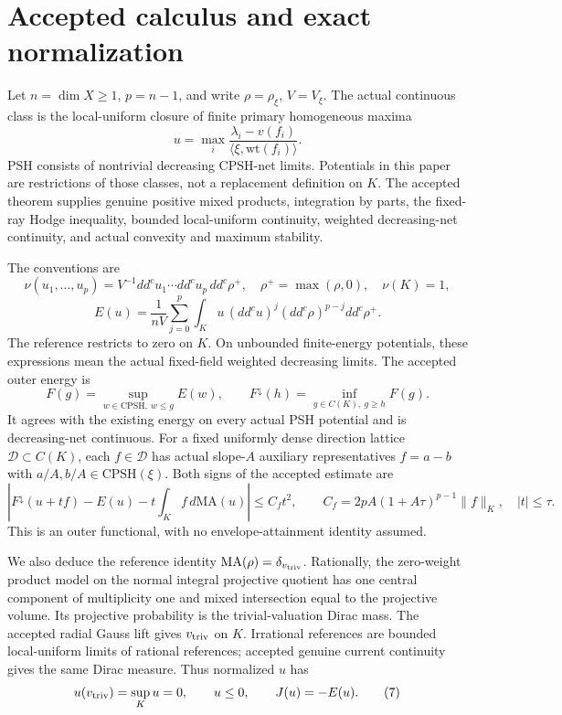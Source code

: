 \documentclass[
  10pt,
]{article}
\begin{document}
\section{Accepted calculus and exact
normalization}\label{accepted-calculus-and-exact-normalization}

Let \(n=\dim X\ge1\), \(p=n-1\), and write \(\rho=\rho_\xi\),
\(V=V_\xi\). The actual continuous class is the local-uniform closure of
finite primary homogeneous maxima
\[u=\max_i\frac{\lambda_i-v(f_i)}{\langle\xi,\mathrm{wt}(f_i)\rangle}.\]
PSH consists of nontrivial decreasing CPSH-net limits. Potentials in
this paper are restrictions of those classes, not a replacement
definition on \(K\). The accepted theorem supplies genuine positive
mixed products, integration by parts, the fixed-ray Hodge inequality,
bounded local-uniform continuity, weighted decreasing-net continuity,
and actual convexity and maximum stability.

The conventions are \[
 \nu(u_1,\ldots,u_p)=V^{-1}dd^cu_1\cdots dd^cu_p\,dd^c\rho^+,
 \quad \rho^+=\max(\rho,0),\quad \nu(K)=1,
 \tag{3}
\] \[
 E(u)=\frac1{nV}\sum_{j=0}^p\int_Ku\,(dd^cu)^j(dd^c\rho)^{p-j}dd^c\rho^+.
 \tag{4}
\] The reference restricts to zero on \(K\). On unbounded finite-energy
potentials, these expressions mean the actual fixed-field weighted
decreasing limits. The accepted outer energy is
\[F(g)=\sup_{w\in\mathrm{CPSH},\ w\le g}E(w),\qquad
 F^\downarrow(h)=\inf_{g\in C(K),\ g\ge h}F(g). \tag{5}\] It agrees with
the existing energy on every actual PSH potential and is decreasing-net
continuous. For a fixed uniformly dense direction lattice
\(\mathscr D\subset C(K)\), each \(f\in\mathscr D\) has actual
slope-\(A\) auxiliary representatives \(f=a-b\) with
\(a/A,b/A\in\mathrm{CPSH}(\xi)\). Both signs of the accepted estimate
are \[
 |F^\downarrow(u+tf)-E(u)-t\int_Kf\,d\mathrm{MA}(u)|
 \le C_f t^2,\qquad C_f=2pA(1+A\tau)^{p-1}\|f\|_K,\quad |t|\le\tau.
 \tag{6}
\] This is an outer functional, with no envelope-attainment identity
assumed.

We also deduce the reference identity
\(\mathrm{MA}(\rho)=\delta_{v_{\rm triv}}\). Rationally, the zero-weight
product model on the normal integral projective quotient has one central
component of multiplicity one and mixed intersection equal to the
projective volume. Its projective probability is the trivial-valuation
Dirac mass. The accepted radial Gauss lift gives \(v_{\rm triv}\) on
\(K\). Irrational references are bounded local-uniform limits of
rational references; accepted genuine current continuity gives the same
Dirac measure. Thus normalized \(u\) has
\[u(v_{\rm triv})=\sup_Ku=0,\qquad u\le0,\qquad J(u)=-E(u). \tag{7}\]
\end{document}
